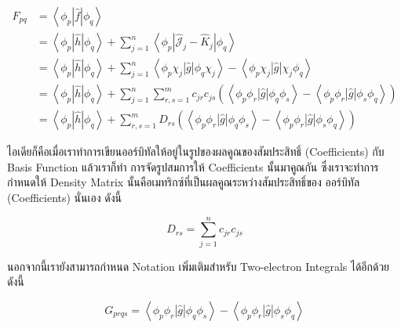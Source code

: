 \begin{equation}
    \label{eq:Fock_Matrix_Elements}
    \begin{aligned}
        F_{p q} 
            & =\left\langle\phi_p|\hat{f}| \phi_q\right\rangle \\
            & = \left\langle\phi_p|\hat{h}| \phi_q\right\rangle 
                + \sum_{j=1}^n
                    \left\langle\phi_p\left|\hat{\mathscr{J}}_j 
                        - \hat{K}_j\right| \phi_q\right\rangle \\
            & =\left\langle\phi_p|\hat{h}| \phi_q\right\rangle 
                + \sum_{j=1}^n
                    \left\langle\phi_p \chi_j|\hat{g}| \phi_q \chi_j\right\rangle 
                    - \left\langle\phi_p \chi_j|\hat{g}| \chi_j \phi_q\right\rangle \\
            & =\left\langle\phi_p|\hat{h}| \phi_q\right\rangle
                + \sum_{j=1}^n \sum_{r, s=1}^m 
                    c_{j r} c_{j s}
                    \left(
                        \left\langle\phi_p \phi_r|\hat{g}| \phi_q \phi_s\right\rangle 
                        - \left\langle\phi_p \phi_r|\hat{g}| \phi_s \phi_q\right\rangle
                    \right) \\
            & =\left\langle\phi_p|\hat{h}| \phi_q\right\rangle
                + \sum_{r, s=1}^m D_{r s}
                    \left(
                        \left\langle\phi_p \phi_r|\hat{g}| \phi_q \phi_s\right\rangle 
                        - \left\langle\phi_p \phi_r|\hat{g}| \phi_s \phi_q\right\rangle
                    \right)
    \end{aligned}
\end{equation}

\noindent ไอเดียก็คือเมื่อเราทำการเขียนออร์บิทัลให้อยู่ในรูปของผลคูณของสัมประสิทธิ์ (Coefficients) กับ Basis Function แล้วเราก็ทำ%
การจัดรูปสมการให้ Coefficients นั้นมาคูณกัน ซึ่งเราจะทำการกำหนดให้ Density Matrix นั้นคือเมทริกซ์ที่เป็นผลคูณระหว่างสัมประสิทธิ์ของ%
ออร์บิทัล (Coefficients) นั่นเอง ดังนี้

\begin{equation}
    \label{eq:Density Matrix}
    D_{r s} = \sum_{j=1}^n c_{j r} c_{j s}
\end{equation}

นอกจากนี้เรายังสามารถกำหนด Notation เพิ่มเติมสำหรับ Two-electron Integrals ได้อีกด้วย ดังนี้

\begin{equation}
    \label{eq:two_electron_integral}
    G_{p r q s} 
    = \left\langle\phi_p \phi_r|\hat{g}| \phi_q \phi_s\right\rangle 
        - \left\langle\phi_p \phi_r|\hat{g}| \phi_s \phi_q\right\rangle
\end{equation}

